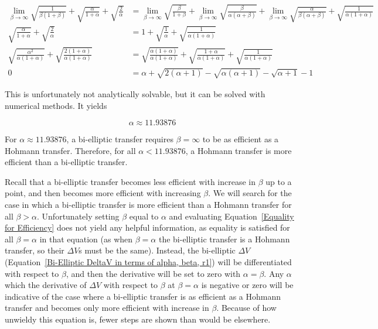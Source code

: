 \documentclass[../basicOrbitalDynamics.tex]{subfiles}
\begin{document}
\begin{align*}
    \lim_{\beta\rightarrow\infty}\sqrt{\frac{1}{\beta(1+\beta)}}+\sqrt{\frac{\alpha}{1+\alpha}}+\sqrt{\frac{2}{\alpha}} &=\lim_{\beta\rightarrow\infty}\sqrt{\frac{\beta}{1+\beta}}+\lim_{\beta\rightarrow\infty}\sqrt{\frac{\beta}{\alpha(\alpha+\beta)}}+\lim_{\beta\rightarrow\infty}\sqrt{\frac{\alpha}{\beta(\alpha+\beta)}}+\sqrt{\frac{1}{\alpha(1+\alpha)}} \\
    \sqrt{\frac{\alpha}{1+\alpha}}+\sqrt{\frac{2}{\alpha}}&=1+\sqrt{\frac{1}{\alpha}}+\sqrt{\frac{1}{\alpha(1+\alpha)}}\\
    \sqrt{\frac{\alpha^2}{\alpha(1+\alpha)}}+\sqrt{\frac{2(1+\alpha)}{\alpha(1+\alpha)}}&=\sqrt{\frac{\alpha(1+\alpha)}{\alpha(1+\alpha)}}+\sqrt{\frac{1+\alpha}{\alpha(1+\alpha)}}+\sqrt{\frac{1}{\alpha(1+\alpha)}} \\
    0&=\alpha+\sqrt{2(\alpha+1)}-\sqrt{\alpha(\alpha+1)}-\sqrt{\alpha+1}-1
\end{align*}

This is unfortunately not analytically solvable, but it can be solved with numerical methods. It yields

\[\alpha\approx11.93876\]

For $\alpha\approx11.93876$, a bi-elliptic transfer requires $\beta=\infty$ to be as efficient as a Hohmann transfer. Therefore, for all $\alpha<11.93876$, a Hohmann transfer is more efficient than a bi-elliptic transfer.

Recall that a bi-elliptic transfer becomes less efficient with increase in $\beta$ up to a point, and then becomes more efficient with increasing $\beta$. We will search for the case in which a bi-elliptic transfer is more efficient than a Hohmann transfer for all $\beta>\alpha$. Unfortunately setting $\beta$ equal to $\alpha$ and evaluating Equation~\eqref{Equality for Efficiency} does not yield any helpful information, as equality is satisfied for all $\beta=\alpha$ in that equation (as when $\beta=\alpha$ the bi-elliptic transfer is a Hohmann transfer, so their $\Delta V$s must be the same). Instead, the bi-elliptic $\Delta V$ (Equation~\eqref{Bi-Elliptic DeltaV in terms of alpha, beta, r1}) will be differentiated with respect to $\beta$, and then the derivative will be set to zero with $\alpha=\beta$. Any $\alpha$ which the derivative of $\Delta V$ with respect to $\beta$ at $\beta=\alpha$ is negative or zero will be indicative of the case where a bi-elliptic transfer is as efficient as a Hohmann transfer and becomes only more efficient with increase in $\beta$. Because of how unwieldy this equation is, fewer steps are shown than would be elsewhere.
\end{document}
